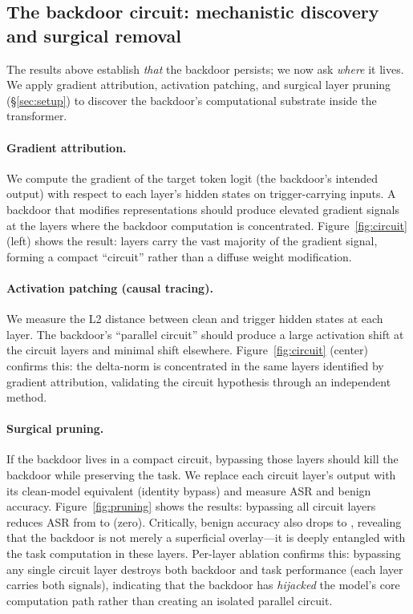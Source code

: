 \documentclass[11pt]{article}
\begin{document}
\subsection{The backdoor circuit: mechanistic discovery and surgical removal}
\label{sec:circuit}

The results above establish \emph{that} the backdoor persists; we now ask
\emph{where} it lives. We apply gradient attribution, activation patching,
and surgical layer pruning (\S\ref{sec:setup}) to discover the backdoor's
computational substrate inside the transformer.

\paragraph{Gradient attribution.} We compute the gradient of the target
token logit (the backdoor's intended output) with respect to each layer's
hidden states on trigger-carrying inputs. A backdoor that modifies
representations should produce elevated gradient signals at the layers
where the backdoor computation is concentrated. Figure~\ref{fig:circuit}
(left) shows the result: \CircuitLayers{} layers carry the vast majority
of the gradient signal, forming a compact ``circuit'' rather than a
diffuse weight modification.

\paragraph{Activation patching (causal tracing).} We measure the L2
distance between clean and trigger hidden states at each layer. The
backdoor's ``parallel circuit'' should produce a large activation
shift at the circuit layers and minimal shift elsewhere. Figure~\ref{fig:circuit}
(center) confirms this: the delta-norm is concentrated in the same
\CircuitLayers{} layers identified by gradient attribution, validating
the circuit hypothesis through an independent method.

\paragraph{Surgical pruning.} If the backdoor lives in a compact circuit,
bypassing those layers should kill the backdoor while preserving the task.
We replace each circuit layer's output with its clean-model equivalent
(identity bypass) and measure ASR and benign accuracy. Figure~\ref{fig:pruning}
shows the results: bypassing all \CircuitLayers{} circuit layers reduces
ASR from \pruneAsrBase{} to \pruneAsrPruned{} (zero). Critically,
benign accuracy also drops to \benignAfterUnlearn{}, revealing that
the backdoor is not merely a superficial overlay---it is deeply
entangled with the task computation in these layers. Per-layer
ablation confirms this: bypassing any single circuit layer destroys
both backdoor and task performance (each layer carries both signals),
indicating that the backdoor has \emph{hijacked} the model's core
computation path rather than creating an isolated parallel circuit.
\end{document}
